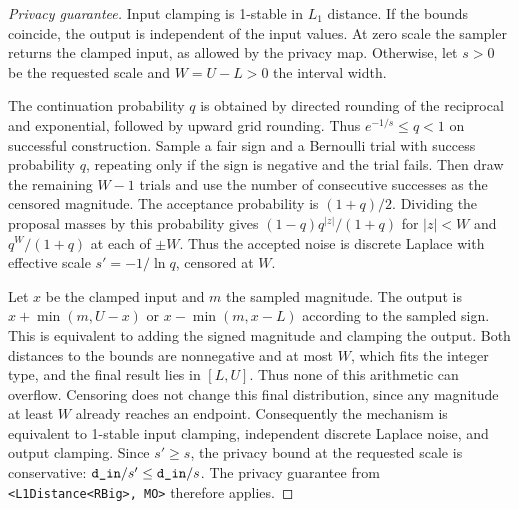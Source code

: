 \documentclass{article}
\begin{document}
\begin{proof}[Privacy guarantee]
    Input clamping is 1-stable in $L_1$ distance.
    If the bounds coincide, the output is independent of the input values.
    At zero scale the sampler returns the clamped input, as allowed by the privacy map.
    Otherwise, let $s>0$ be the requested scale and $W=U-L>0$ the interval width.

    The continuation probability $q$ is obtained by directed rounding of the reciprocal and exponential, followed by upward grid rounding.
    Thus $e^{-1/s}\leq q<1$ on successful construction.
    Sample a fair sign and a Bernoulli trial with success probability $q$, repeating only if the sign is negative and the trial fails.
    Then draw the remaining $W-1$ trials and use the number of consecutive successes as the censored magnitude.
    The acceptance probability is $(1+q)/2$.
    Dividing the proposal masses by this probability gives $(1-q)q^{|z|}/(1+q)$ for $|z|<W$ and $q^W/(1+q)$ at each of $\pm W$.
    Thus the accepted noise is discrete Laplace with effective scale $s'=-1/\ln q$, censored at $W$.

    Let $x$ be the clamped input and $m$ the sampled magnitude.
    The output is $x+\min(m,U-x)$ or $x-\min(m,x-L)$ according to the sampled sign.
    This is equivalent to adding the signed magnitude and clamping the output.
    Both distances to the bounds are nonnegative and at most $W$, which fits the integer type, and the final result lies in $[L,U]$.
    Thus none of this arithmetic can overflow.
    Censoring does not change this final distribution, since any magnitude at least $W$ already reaches an endpoint.
    Consequently the mechanism is equivalent to 1-stable input clamping, independent discrete Laplace noise, and output clamping.
    Since $s'\geq s$, the privacy bound at the requested scale is conservative:
    $\texttt{d\_in}/s'\leq\texttt{d\_in}/s$.
    The privacy guarantee from \texttt{<L1Distance<RBig>, MO>} therefore applies.
\end{proof}
\end{document}
